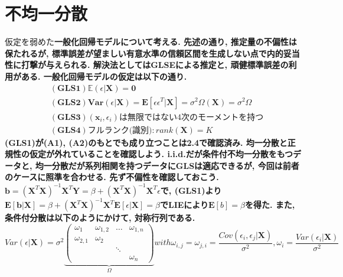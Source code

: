 \documentclass[paper=a4paper,fontsize=10pt]{jlreq}
\begin{document}
\section{不均一分散}
仮定を弱めた\rmfamily\mcfamily\bfseries{一般化回帰モデル}\mdseries について考える. 先述の通り, 推定量の不偏性は保たれるが, 標準誤差が\rmfamily\mcfamily\bfseries{望ましい有意水準の信頼区間を生成しない}\mdseries 点で内的妥当性に打撃が与えられる. 解決法としてはGLSEによる推定と, 頑健標準誤差の利用がある. 一般化回帰モデルの仮定は以下の通り.
\begin{align*}
  &\mathbf{(GLS1)}　\mathbb{E}(\epsilon|\mathbf{X})=\mathbf{0}\\
  &\mathbf{(GLS2)}　\mathbf{Var}(\epsilon | \mathbf{X})=\mathbf{E}[\epsilon\epsilon^T| \mathbf{X}]=\sigma^2\Omega(\mathbf{X})=\sigma^2\Omega\\
  &\mathbf{(GLS3)}　(\mathbf{x}_{i}, \epsilon_{i})\text{は無限ではない4次のモーメントを持つ}\\
  &\mathbf{(GLS4)}　\text{フルランク(識別)}: rank(\mathbf{X})=K
\end{align*}
(GLS1)が(A1), (A2)のもとでも成り立つことは\rmfamily\mcfamily\bfseries{2.4}\mdseries で確認済み. 均一分散と正規性の仮定が外れていることを確認しよう. i.i.d.だが条件付不均一分散をもつデータと, 均一分散だが系列相関を持つデータにGLSは適応できるが, 今回は前者のケースに照準を合わせる. 先ず不偏性を確認しておこう. $\mathbf{b}=(\mathbf{X}^{T}\mathbf{X})^{-1}\mathbf{X}^{T}\mathbf{Y}=\beta+(\mathbf{X}^{T}\mathbf{X})^{-1}\mathbf{X}^{T}\epsilon$で, (GLS1)より$\mathbf{E}[\mathbf{b}|\mathbf{X}]=\beta+(\mathbf{X}^{T}\mathbf{X})^{-1}\mathbf{X}^{T}\mathbf{E}[\epsilon|\mathbf{X}]=\beta$でLIEにより$\mathbf{E}[b]=\beta$を得た. また, 条件付分散は以下のようにかけて, 対称行列である.
\begin{equation*}
  Var(\epsilon|\mathbf{X})
  =\sigma^2
  \underset{\Omega}{\underbrace{
  \begin{pmatrix}
    \omega_{1}&\omega_{1,2}&\dots&\omega_{1,n}\\
    \omega_{2,1}&\omega_{2}\\
    &&\ddots\\
    &&&\omega_{n}
 \end{pmatrix}
  }}
 　with　\omega_{i,j}=\omega_{j,i}=\frac{Cov(\epsilon_i,\epsilon_j|\mathbf{X})}{\sigma^2}, \omega_i=\frac{Var(\epsilon_i|\mathbf{X})}{\sigma^2}
\end{equation*}
\end{document}
